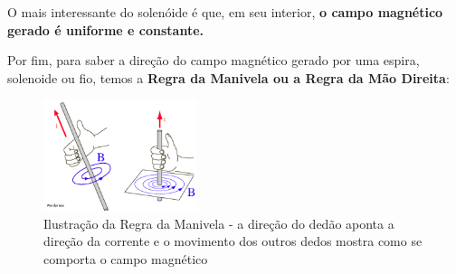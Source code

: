 \documentclass[12pt]{extarticle}
\newcommand{\<}{\langle}
\renewcommand{\>}{\rangle}
\theoremstyle{definition}
\begin{document}
O mais interessante do solenóide é que, em seu interior, \textbf{o campo magnético gerado é uniforme e constante.}

Por fim, para saber a direção do campo magnético gerado por uma espira, solenoide ou fio, temos a \textbf{Regra da Manivela ou a Regra da Mão Direita}:
\begin{figure}[H]
    \centering
    \includegraphics[width=0.4\textwidth]{regra_manivela.png}
    \caption{Ilustração da Regra da Manivela - a direção do dedão aponta a direção da corrente e o movimento dos outros dedos mostra como se comporta o campo magnético}
    \label{fig:my_label}
\end{figure}
\end{document}
